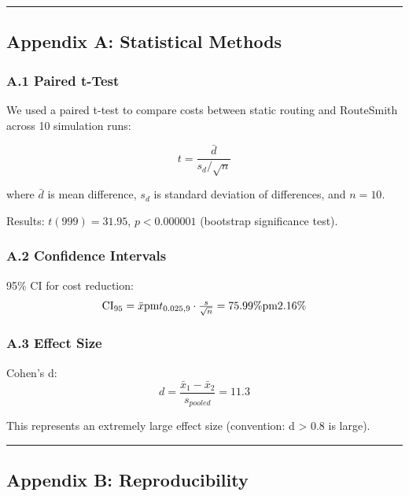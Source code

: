 \documentclass[
]{article}
\begin{document}
\begin{center}\rule{0.5\linewidth}{0.5pt}\end{center}

\hypertarget{appendix-a-statistical-methods}{%
\subsection{Appendix A: Statistical
Methods}\label{appendix-a-statistical-methods}}

\hypertarget{a.1-paired-t-test}{%
\subsubsection{A.1 Paired t-Test}\label{a.1-paired-t-test}}

We used a paired t-test to compare costs between static routing and
RouteSmith across 10 simulation runs:

\[t = \frac{\bar{d}}{s_d / \sqrt{n}}\]

where \(\bar{d}\) is mean difference, \(s_d\) is standard deviation of
differences, and \(n = 10\).

Results: \(t(999) = 31.95\), \(p < 0.000001\) (bootstrap significance
test).

\hypertarget{a.2-confidence-intervals}{%
\subsubsection{A.2 Confidence
Intervals}\label{a.2-confidence-intervals}}

95\% CI for cost reduction:
\[\text{CI}_{95} = \bar{x} $\\pm$ t_{0.025, 9} \cdot \frac{s}{\sqrt{n}} = 75.99\% $\\pm$ 2.16\%\]

\hypertarget{a.3-effect-size}{%
\subsubsection{A.3 Effect Size}\label{a.3-effect-size}}

Cohen's d: \[d = \frac{\bar{x}_1 - \bar{x}_2}{s_{pooled}} = 11.3\]

This represents an extremely large effect size (convention: d
\textgreater{} 0.8 is large).

\begin{center}\rule{0.5\linewidth}{0.5pt}\end{center}

\hypertarget{appendix-b-reproducibility}{%
\subsection{Appendix B:
Reproducibility}\label{appendix-b-reproducibility}}
\end{document}
